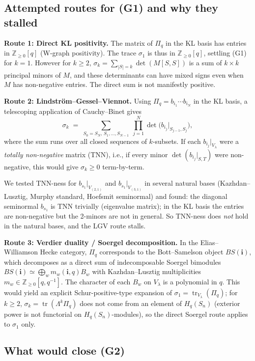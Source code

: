 \documentclass[11pt]{article}
\theoremstyle{definition}
\newcommand{\Pq}{\Pi_q}
\newcommand{\Hq}{H_q(S_n)}
\newcommand{\Z}{\mathbb{Z}}
\newcommand{\tr}{\operatorname{tr}}
\begin{document}
\subsection*{Attempted routes for (G1) and why they stalled}

\textbf{Route 1: Direct KL positivity.} The matrix of $\Pq$ in the KL
basis has entries in $\Z_{\ge 0}[q]$ (W-graph positivity). The trace
$\sigma_1$ is thus in $\Z_{\ge 0}[q]$, settling (G1) for $k=1$.
However for $k\ge 2$, $\sigma_k=\sum_{|S|=k}\det(M[S,S])$ is a sum of
$k\times k$ principal minors of $M$, and these determinants can have
mixed signs even when $M$ has non-negative entries. The direct sum is
not manifestly positive.

\textbf{Route 2: Lindström--Gessel--Viennot.} Using
$\Pq=b_{i_1}\cdots b_{i_N}$ in the KL basis, a telescoping application
of Cauchy--Binet gives
\[
  \sigma_k \;=\; \sum_{S_0=S_N,\,S_1,\ldots,S_{N-1}}\;
  \prod_{j=1}^{N}\det\bigl(b_{i_j}|_{S_{j-1},S_j}\bigr),
\]
where the sum runs over all closed sequences of $k$-subsets. If each
$b_{i_j}|_{V_\lambda}$ were a \emph{totally non-negative} matrix
(TNN), i.e., if every minor $\det(b_{i_j}|_{S,T})$ were non-negative,
this would give $\sigma_k\ge 0$ term-by-term.

We tested TNN-ness for $b_{s_1}|_{V_{(2,1)}}$ and
$b_{s_1}|_{V_{(3,1)}}$ in several natural bases (Kazhdan--Lusztig,
Murphy standard, Hoefsmit seminormal) and found: the diagonal
seminormal $b_{s_1}$ is TNN trivially (eigenvalue matrix); in the KL
basis the entries are non-negative but the 2-minors are not in general.
So TNN-ness does \emph{not} hold in the natural bases, and the LGV
route stalls.

\textbf{Route 3: Verdier duality / Soergel decomposition.} In the
Elias--Williamson Hecke category, $\Pq$ corresponds to the
Bott--Samelson object $BS(\mathbf{i})$, which decomposes as a direct
sum of indecomposable Soergel bimodules $BS(\mathbf{i})\simeq
\bigoplus_w m_w(\mathbf{i},q)B_w$ with Kazhdan--Lusztig multiplicities
$m_w\in\Z_{\ge 0}[q,q^{-1}]$. The character of each $B_w$ on $V_\lambda$
is a polynomial in $q$. This would yield an explicit Schur-positive-type
expansion of $\sigma_1=\tr_{V_\lambda}(\Pq)$; for $k\ge 2$,
$\sigma_k=\tr(\Lambda^k\Pq)$ does not come from an element of $\Hq$
(exterior power is not functorial on $\Hq$-modules), so the direct
Soergel route applies to $\sigma_1$ only.

\subsection*{What would close (G2)}
\end{document}
